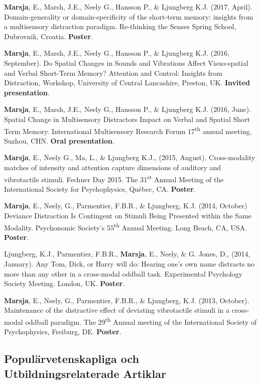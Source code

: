 \documentclass[]{article}
\begin{document}
\textbf{Marsja}, E., Marsh, J.E., Neely G., Hansson P., \& Ljungberg
K.J. (2017, April). Domain-generality or domain-specificity of the
short-term memory: insights from a multisensory distraction paradigm.
Re-thinking the Senses Spring School, Dubrovnik, Croatia.
\textbf{Poster}.

\textbf{Marsja}, E., Marsh, J.E., Neely G., Hansson P., \& Ljungberg
K.J. (2016, September). Do Spatial Changes in Sounds and Vibrations
Affect Visuo-spatial and Verbal Short-Term Memory? Attention and
Control: Insights from Distraction, Workshop, University of Central
Lancashire, Preston, UK. \textbf{Invited presentation}.

\textbf{Marsja}, E., Marsh, J.E., Neely G., Hansson P., \& Ljungberg
K.J. (2016, June). Spatial Change in Multisensory Distractors Impact on
Verbal and Spatial Short Term Memory. International Multisensory
Research Forum 17\textsuperscript{th} annual meeting, Suzhou, CHN.
\textbf{Oral presentation}.

\textbf{Marsja}, E., Neely G., Ma, L., \& Ljungberg K.J., (2015,
August). Cross-modality matches of intensity and attention capture
dimensions of auditory and vibrotactile stimuli. Fechner Day 2015. The
31\textsuperscript{st} Annual Meeting of the International Society for
Psychophysics, Québec, CA. \textbf{Poster}.

\textbf{Marsja}, E., Neely, G., Parmentier, F.B.R., \& Ljungberg, K.J.
(2014, October) Deviance Distraction Is Contingent on Stimuli Being
Presented within the Same Modality. Psychonomic Society's
55\textsuperscript{th} Annual Meeting. Long Beach, CA, USA.
\textbf{Poster}.

Ljungberg, K.J., Parmentier, F.B.R., \textbf{Marsja}, E., Neely, \& G.
Jones, D., (2014, January). Any Tom, Dick, or Harry will do: Hearing
one's own name distracts no more than any other in a cross-modal oddball
task. Experimental Psychology Society Meeting. London, UK.
\textbf{Poster}.

\textbf{Marsja}, E., Neely, G., Parmentier, F.B.R., \& Ljungberg, K.J.
(2013, October). Maintenance of the distractive effect of deviating
vibrotactile stimuli in a cross-modal oddball paradigm. The
29\textsuperscript{th} Annual meeting of the International Society of
Psychophysics, Freiburg, DE. \textbf{Poster}.

\hypertarget{populuxe4rvetenskapliga-och-utbildningsrelaterade-artiklar}{%
\subsection{Populärvetenskapliga och Utbildningsrelaterade
Artiklar}\label{populuxe4rvetenskapliga-och-utbildningsrelaterade-artiklar}}
\end{document}
